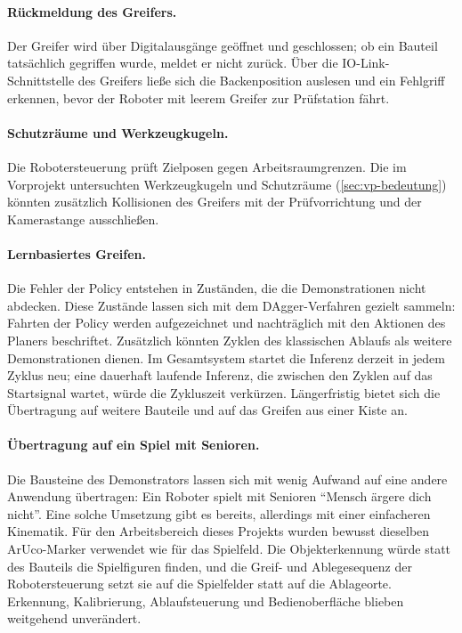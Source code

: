 \paragraph{Rückmeldung des Greifers.} Der Greifer wird über Digitalausgänge geöffnet und
geschlossen; ob ein Bauteil tatsächlich gegriffen wurde, meldet er nicht zurück. Über die
IO-Link-Schnittstelle des Greifers ließe sich die Backenposition auslesen und ein Fehlgriff
erkennen, bevor der Roboter mit leerem Greifer zur Prüfstation fährt.

\paragraph{Schutzräume und Werkzeugkugeln.} Die Robotersteuerung prüft Zielposen gegen
Arbeitsraumgrenzen. Die im Vorprojekt untersuchten Werkzeugkugeln und Schutzräume
(\cref{sec:vp-bedeutung}) könnten zusätzlich Kollisionen des Greifers mit der Prüfvorrichtung
und der Kamerastange ausschließen.

\paragraph{Lernbasiertes Greifen.} Die Fehler der Policy entstehen in Zuständen, die die
Demonstrationen nicht abdecken. Diese Zustände lassen sich mit dem DAgger-Verfahren gezielt
sammeln: Fahrten der Policy werden aufgezeichnet und nachträglich mit den Aktionen des Planers
beschriftet. Zusätzlich könnten Zyklen des klassischen Ablaufs als weitere Demonstrationen
dienen. Im Gesamtsystem startet die Inferenz derzeit in jedem Zyklus neu; eine dauerhaft
laufende Inferenz, die zwischen den Zyklen auf das Startsignal wartet, würde die Zykluszeit
verkürzen. Längerfristig bietet sich die Übertragung auf weitere Bauteile und auf das Greifen
aus einer Kiste an.

\paragraph{Übertragung auf ein Spiel mit Senioren.} Die Bausteine des Demonstrators lassen sich
mit wenig Aufwand auf eine andere Anwendung übertragen: Ein Roboter spielt mit Senioren
\enquote{Mensch ärgere dich nicht}. Eine solche Umsetzung gibt es bereits, allerdings mit einer
einfacheren Kinematik. Für den Arbeitsbereich dieses Projekts wurden bewusst dieselben
ArUco-Marker verwendet wie für das Spielfeld. Die Objekterkennung würde statt des Bauteils die
Spielfiguren finden, und die Greif- und Ablegesequenz der Robotersteuerung setzt sie auf die
Spielfelder statt auf die Ablageorte. Erkennung, Kalibrierung, Ablaufsteuerung und
Bedienoberfläche blieben weitgehend unverändert.
